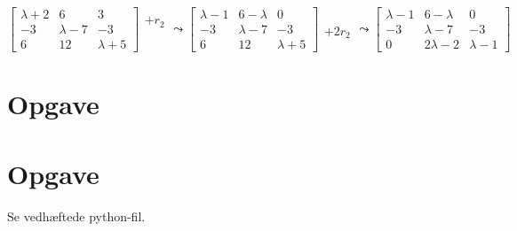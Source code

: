 \documentclass[a4paper,12pt]{article}
\begin{document}
$
\left[\begin{array}{ccc}
    \lambda+2 & 6 & 3\\
    -3 & \lambda-7 & -3 \\
    6 & 12 & \lambda+5
\end{array}\right]
\begin{array}{ccc}
    +r_2\\
    \\
    \\
\end{array}
\leadsto
\left[\begin{array}{ccc}
    \lambda-1 & 6-\lambda & 0\\
    -3 & \lambda-7 & -3 \\
    6 & 12 & \lambda+5
\end{array}\right]
\begin{array}{ccc}
    \\
    \\
    +2r_2\\
\end{array}
\leadsto
\left[\begin{array}{ccc}
    \lambda-1 & 6-\lambda & 0\\
    -3 & \lambda-7 & -3 \\
    0 & 2\lambda -2 & \lambda-1
\end{array}\right]
$\\

\subsection{}


\subsection{}


\subsection{}


\subsection{}



\section[Opgave]{Opgave}
\subsection{}


\subsection{}


\subsection{}


\section[Opgave]{Opgave}
Se vedhæftede python-fil.
\end{document}
